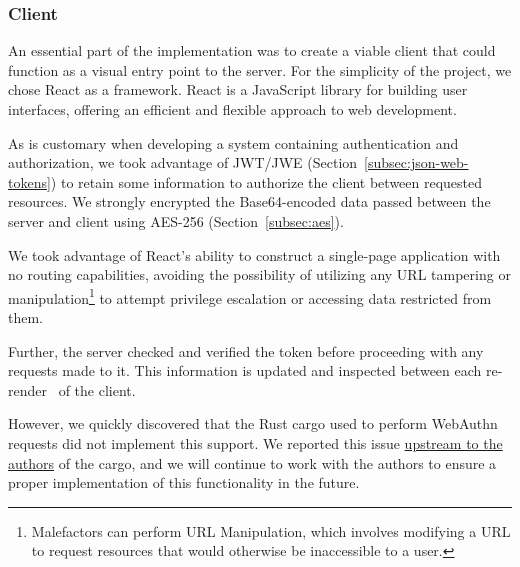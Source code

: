 
\subsubsection{Client}
An essential part of the implementation was to create a viable client that could
function as a visual entry point to the server.
For the simplicity of the project, we chose React as a framework.
React is a JavaScript library for building user interfaces, offering an
efficient and flexible approach to web development.


As is customary when developing a system containing authentication and
authorization, we took advantage of JWT/JWE
(Section~\ref{subsec:json-web-tokens})
to retain some information to authorize the client between requested resources.
We strongly encrypted the Base64-encoded data passed between the server and
client using AES-256 (Section~\ref{subsec:aes}).

We took advantage of React's ability to construct a single-page application with
no routing capabilities, avoiding the possibility of utilizing any URL tampering
or manipulation\footnote{
  Malefactors can perform URL Manipulation, which involves modifying a URL to
  request resources that would otherwise be inaccessible to a user.
} to attempt privilege escalation or accessing data restricted from them.

Further, the server checked and verified the token before proceeding with any
requests made to it.
This information is updated and inspected between each
re-render~\cite{react-component} of the client.

However, we quickly discovered that the Rust cargo used to perform WebAuthn
requests did not implement this support.
We reported this issue
\href{https://github.com/kanidm/webauthn-rs/issues/288}{upstream to the authors}
of the cargo, and we will continue to work with the authors to ensure a proper
implementation of this functionality in the future.

